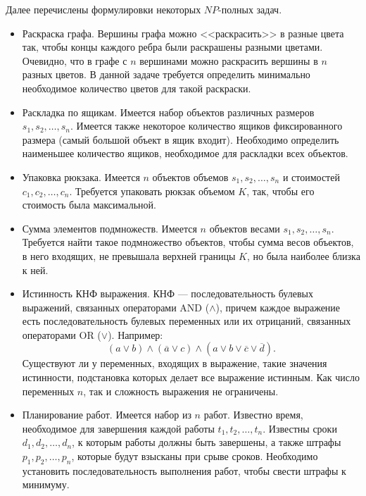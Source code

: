 Далее перечислены формулировки некоторых $NP$-полных задач.
\begin{itemize}
    \item Раскраска графа. Вершины графа можно <<раскрасить>> в разные цвета так, чтобы концы каждого ребра были раскрашены разными цветами. Очевидно, что в графе с $n$ вершинами можно раскрасить вершины в $n$ разных цветов. В данной задаче требуется определить минимально необходимое количество цветов для такой раскраски.
    
    \item Раскладка по ящикам. Имеется набор объектов различных размеров $s_1,s_2,\ldots,s_n$. Имеется также некоторое количество ящиков фиксированного размера (самый большой объект в ящик входит). Необходимо определить наименьшее количество ящиков, необходимое для раскладки всех объектов.
    
    \item Упаковка рюкзака. Имеется $n$ объектов объемов $s_1,s_2,\ldots,s_n$ и стоимостей $c_1,c_2,\ldots,c_n$. Требуется упаковать рюкзак объемом $K$, так, чтобы его стоимость была максимальной.
    
    \item Сумма элементов подмножеств. Имеется $n$ объектов весами $s_1,s_2,\ldots,s_n$. Требуется найти такое подмножество объектов, чтобы сумма весов объектов, в него входящих, не превышала верхней границы $K$, но была наиболее близка к ней.
    
    \item Истинность КНФ выражения. КНФ --- последовательность булевых выражений, связанных операторами AND ($\land$), причем каждое выражение есть последовательность булевых переменных или их отрицаний, связанных операторами OR ($\lor$). Например:
    \[
        (a\lor b)\land(\overline{a}\lor c)\land(a\lor b\lor\overline{c}\lor\overline{d}).
    \]
    Существуют ли у переменных, входящих в выражение, такие значения истинности, подстановка которых делает все выражение истинным. Как число переменных $n$, так и сложность выражения не ограничены.
    
    \item Планирование работ. Имеется набор из $n$ работ. Известно время, необходимое для завершения каждой работы $t_1,t_2,\ldots,t_n$. Известны сроки $d_1,d_2,\ldots,d_n$, к которым работы должны быть завершены, а также штрафы $p_1,p_2,\ldots,p_n$, которые будут взысканы при срыве сроков. Необходимо установить последовательность выполнения работ, чтобы свести штрафы к минимуму.
\end{itemize}


